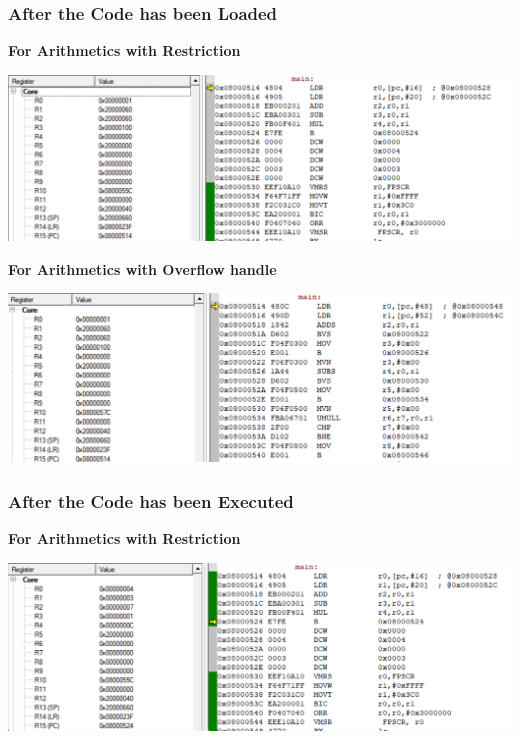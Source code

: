 \documentclass{article}
\begin{document}
\subsubsection{After the Code has been Loaded}

\textbf{For Arithmetics with Restriction}\newline\newline
\begin{center}
    \includegraphics[width=1\textwidth]{Arithmetics_Before.png}
\end{center}

\textbf{For Arithmetics with Overflow handle}\newline\newline
\begin{center}
    \includegraphics[width=1\textwidth]{Arithmetics_Overflow_Before.png}
\end{center}

\subsubsection{After the Code has been Executed}

\textbf{For Arithmetics with Restriction}\newline\newline
\begin{center}
    \includegraphics[width=1\textwidth]{Arithmetics_After.png}
\end{center}
\end{document}
